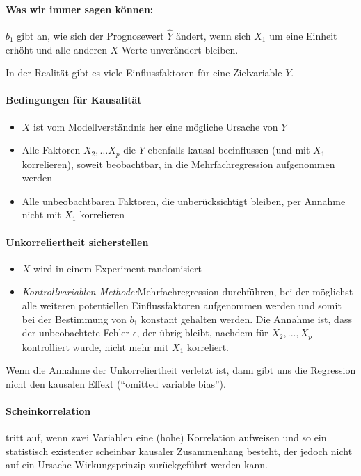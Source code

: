 \documentclass[a3paper, 8pt]{extarticle}
\begin{document}
\begin{multicols*}{5}
\paragraph{Was wir immer sagen können:}
$b_1$ gibt an, wie sich der Prognosewert $\hat{Y}$ ändert, wenn sich $X_1$ um eine Einheit erhöht und alle anderen $X$-Werte unverändert bleiben.

In der Realität gibt es viele Einflussfaktoren für eine Zielvariable $Y$.

\paragraph{Bedingungen für Kausalität}
\begin{itemize}
    \item $X$ ist vom Modellverständnis her eine mögliche Ursache von $Y$
    \item Alle Faktoren $X_2, \dots X_p$ die $Y$ ebenfalls kausal beeinflussen (und mit $X_1$ korrelieren), soweit beobachtbar, in die Mehrfachregression aufgenommen werden
    \item Alle unbeobachtbaren Faktoren, die unberücksichtigt bleiben, per Annahme nicht mit $X_1$ korrelieren
\end{itemize}

\paragraph{Unkorreliertheit sicherstellen} 
\begin{itemize}
    \item $X$ wird in einem Experiment randomisiert
    \item \textit{Kontrollvariablen-Methode:}Mehrfachregression durchführen, bei der möglichst alle weiteren potentiellen Einflussfaktoren aufgenommen werden und somit bei der Bestimmung von $b_1$ konstant gehalten werden. Die Annahme ist, dass der unbeobachtete Fehler $\epsilon$, der übrig bleibt, nachdem für $X_2, . . . , X_p$ kontrolliert wurde, nicht mehr mit $X_1$ korreliert.
\end{itemize}

Wenn die Annahme der Unkorreliertheit verletzt ist, dann gibt uns die Regression nicht den kausalen Effekt (“omitted variable bias”).

\paragraph{Scheinkorrelation} tritt auf, wenn zwei Variablen eine (hohe) Korrelation aufweisen und so ein statistisch existenter scheinbar kausaler Zusammenhang besteht, der jedoch nicht auf ein Ursache-Wirkungsprinzip zurückgeführt werden kann.


\end{multicols*}
\end{document}
